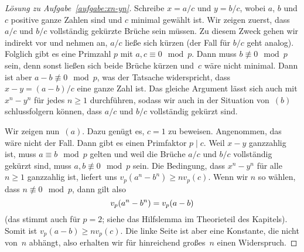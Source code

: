 \begin{proof}[Lösung zu Aufgabe~\ref{aufgabe:xn-yn}]
	Schreibe $x=a/c$ und $y=b/c$, wobei $a$, $b$ und $c$ positive ganze Zahlen sind und $c$ minimal gewählt ist. Wir zeigen zuerst, dass $a/c$ und $b/c$ vollständig gekürzte Brüche sein müssen. Zu diesem Zweck gehen wir indirekt vor und nehmen an, $a/c$ ließe sich kürzen (der Fall für $b/c$ geht analog). Folglich gibt es eine Primzahl $p$ mit $a,c\equiv 0\mod p$. Dann muss $b\not\equiv 0\mod p$ sein, denn sonst ließen sich beide Brüche kürzen und~$c$ wäre nicht minimal. Dann ist aber $a-b\not\equiv 0\mod p$, was der Tatsache widerspricht, dass $x-y=(a-b)/c$ eine ganze Zahl ist. Das gleiche Argument lässt sich auch mit $x^n-y^n$ für jedes $n\geqslant 1$ durchführen, sodass wir auch in der Situation von~$(b)$ schlussfolgern können, dass  $a/c$ und $b/c$ vollständig gekürzt sind.
	
	Wir zeigen nun~$(a)$. Dazu genügt es, $c=1$ zu beweisen. Angenommen, das wäre nicht der Fall. Dann gibt es einen Primfaktor $p\mid c$. Weil $x-y$ ganzzahlig ist, muss $a\equiv b\mod p$ gelten und weil die Brüche  $a/c$ und $b/c$ vollständig gekürzt sind, muss $a,b\not\equiv 0\mod p$ sein. Die Bedingung, dass $x^n-y^n$ für alle $n\geqslant 1$ ganzzahlig ist, liefert uns $v_p(a^n-b^n)\geqslant nv_p(c)$. Wenn wir $n$ so wählen, dass $n\not\equiv 0\mod p$, dann gilt also
	\begin{equation*}
		v_p\parens*{a^n-b^n}=v_p(a-b)
	\end{equation*}
	(das stimmt auch für $p=2$; siehe das Hilfslemma im Theorieteil des Kapitels). Somit ist $v_p(a-b)\geqslant nv_p(c)$. Die linke Seite ist aber eine Konstante, die nicht von~$n$ abhängt, also erhalten wir für hinreichend großes~$n$ einen Widerspruch.
	

\end{proof}
